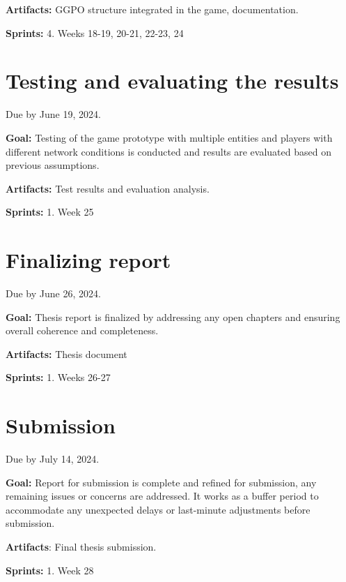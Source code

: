 \noindent\textbf{Artifacts:} GGPO structure integrated in the game, documentation. \newline

\noindent\textbf{Sprints:} 4. Weeks 18-19, 20-21, 22-23, 24\newline

\section{Testing and evaluating the results}

Due by June 19, 2024.\newline

\noindent\textbf{Goal:} Testing of the game prototype with multiple entities and players with different network conditions is conducted and results are evaluated based on previous assumptions. \newline

\noindent\textbf{Artifacts:} Test results and evaluation analysis. \newline

\noindent\textbf{Sprints:} 1. Week 25\newline

\section{Finalizing report}

Due by June 26, 2024.\newline

\noindent\textbf{Goal:} Thesis report is finalized by addressing any open chapters and ensuring overall coherence and completeness.\newline

\noindent\textbf{Artifacts:} Thesis document \newline

\noindent\textbf{Sprints:} 1. Weeks 26-27\newline

\section{Submission}

Due by July 14, 2024.\newline

\noindent\textbf{Goal:} Report for submission is complete and refined for submission, any remaining issues or concerns are addressed. It works as a buffer period to accommodate any unexpected delays or last-minute adjustments before submission.\newline

\noindent\textbf{Artifacts}: Final thesis submission.

\noindent\textbf{Sprints:} 1. Week 28


